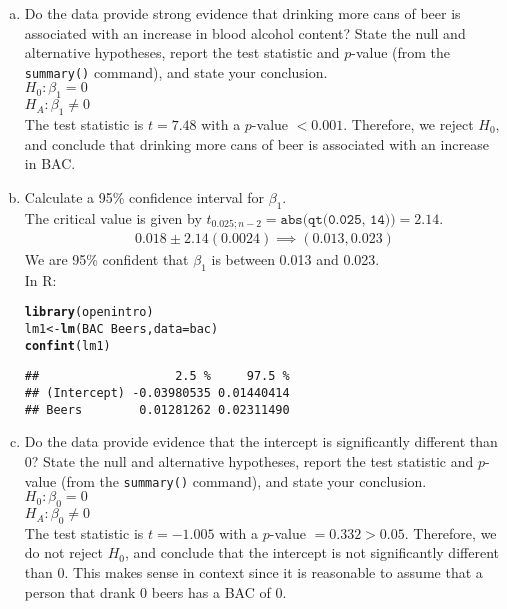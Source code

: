 \documentclass[11pt]{article}\usepackage[]{graphicx}\usepackage[]{color}
\makeatletter
\newcommand{\hlopt}[1]{\textcolor[rgb]{0,0,0}{#1}}%
\newcommand{\hlstd}[1]{\textcolor[rgb]{0.345,0.345,0.345}{#1}}%
\newcommand{\hlkwb}[1]{\textcolor[rgb]{0.69,0.353,0.396}{#1}}%
\newcommand{\hlkwc}[1]{\textcolor[rgb]{0.333,0.667,0.333}{#1}}%
\newcommand{\hlkwd}[1]{\textcolor[rgb]{0.737,0.353,0.396}{\textbf{#1}}}%
\newenvironment{kframe}{%
 \def\at@end@of@kframe{}%
 \ifinner\ifhmode%
  \def\at@end@of@kframe{\end{minipage}}%
  \begin{minipage}{\columnwidth}%
 \fi\fi%
 \def\FrameCommand##1{\hskip\@totalleftmargin \hskip-\fboxsep
 \colorbox{shadecolor}{##1}\hskip-\fboxsep
     \hskip-\linewidth \hskip-\@totalleftmargin \hskip\columnwidth}%
 \MakeFramed {\advance\hsize-\width
   \@totalleftmargin\z@ \linewidth\hsize
   \@setminipage}}%
 {\par\unskip\endMakeFramed%
 \at@end@of@kframe}
\newenvironment{knitrout}{}{} %
\makeatother
\begin{document}
\begin{enumerate}[(a)]
\item Do the data provide strong evidence that drinking more cans of beer is associated with an increase in blood alcohol content?  State the null and alternative hypotheses, report the test statistic and $p$-value (from the \texttt{summary()} command), and state your conclusion.\\
$H_0: \beta_1 = 0$\\
$H_A: \beta_1 \neq 0$\\
The test statistic is $t=7.48$ with a $p$-value $<0.001$.  Therefore, we reject $H_0$, and conclude that drinking more cans of beer is associated with an increase in BAC.   
\clearpage

\item Calculate a 95\% confidence interval for $\beta_1$.\\
The critical value is given by $t_{0.025; n-2} = \texttt{abs(qt(0.025, 14))} = 2.14$.
\begin{align*}
0.018 \pm 2.14(0.0024) \implies (0.013, 0.023) 
\end{align*}
We are 95\% confident that $\beta_1$ is between 0.013 and 0.023.\\
In R:
\begin{knitrout}
\color{fgcolor}\begin{kframe}
\begin{alltt}
\hlkwd{library}\hlstd{(openintro)}
\hlstd{lm1} \hlkwb{<-} \hlkwd{lm}\hlstd{(BAC} \hlopt{~} \hlstd{Beers,} \hlkwc{data} \hlstd{= bac)}
\hlkwd{confint}\hlstd{(lm1)}
\end{alltt}
\begin{verbatim}
##                   2.5 %     97.5 %
## (Intercept) -0.03980535 0.01440414
## Beers        0.01281262 0.02311490
\end{verbatim}
\end{kframe}
\end{knitrout}


\item Do the data provide evidence that the intercept is significantly different than 0?  State the null and alternative hypotheses, report the test statistic and $p$-value (from the \texttt{summary()} command), and state your conclusion.\\
$H_0: \beta_0 = 0$\\
$H_A: \beta_0 \neq 0$\\
The test statistic is $t=-1.005$ with a $p$-value $=0.332 > 0.05$.  Therefore, we do not reject $H_0$, and conclude that the intercept is not significantly different than 0.  This makes sense in context since it is reasonable to assume that a person that drank 0 beers has a BAC of 0.\\


\end{enumerate}
\end{document}
